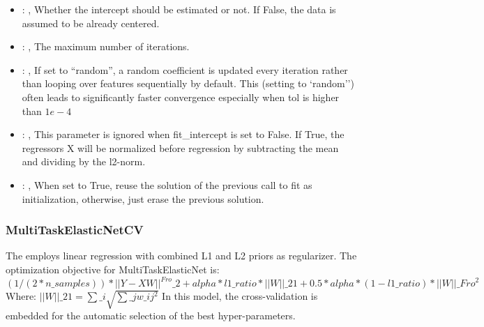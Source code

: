 \begin{itemize}
    \item {}: , 
      Whether the intercept should be estimated or not. If False,
      the data is assumed to be already centered.

    \item {}: , 
      The maximum number of iterations.

    \item {}: , 
      If set to ``random'', a random coefficient is updated every iteration
      rather than looping over features sequentially by default. This (setting to `random'')
      often leads to significantly faster convergence especially when tol is higher than $1e-4$

    \item {}: , 
      This parameter is ignored when fit\_intercept is set to False. If True,
      the regressors X will be normalized before regression by subtracting the mean and
      dividing by the l2-norm.

    \item {}: , 
      When set to True, reuse the solution of the previous call
      to fit as initialization, otherwise, just erase the previous solution.
  \end{itemize}


\subsubsection{MultiTaskElasticNetCV}
  The  employs                         linear regression with
  combined L1 and L2 priors as regularizer.                         The optimization objective for
  MultiTaskElasticNet is:                         $(1 / (2 * n\_samples)) * ||Y - XW||^{Fro}\_2
  + alpha * l1\_ratio * ||W||\_{21}                         + 0.5 * alpha * (1 - l1\_ratio) *
  ||W||\_{Fro}^2$                         \\Where:                         $||W||\_{21} = \sum\_i
  \sqrt{\sum\_j w\_{ij}^2}$                         In this model, the cross-validation is embedded
  for the automatic selection                         of the best hyper-parameters.

